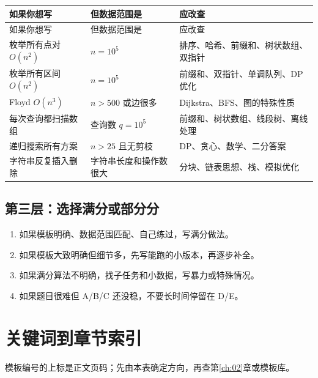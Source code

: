 \begin{longtable}{p{5cm}p{4.5cm}p{4.5cm}}
\toprule
如果你想写 & 但数据范围是 & 应改查 \\
\midrule
\endfirsthead
\toprule
如果你想写 & 但数据范围是 & 应改查 \\
\midrule
\endhead
枚举所有点对 $O(n^2)$ & $n=10^5$ & 排序、哈希、前缀和、树状数组、双指针 \\
枚举所有区间 $O(n^2)$ & $n=10^5$ & 前缀和、双指针、单调队列、DP 优化 \\
Floyd $O(n^3)$ & $n>500$ 或边很多 & Dijkstra、BFS、图的特殊性质 \\
每次查询都扫描数组 & 查询数 $q=10^5$ & 前缀和、树状数组、线段树、离线处理 \\
递归搜索所有方案 & $n>25$ 且无剪枝 & DP、贪心、数学、二分答案 \\
字符串反复插入删除 & 字符串长度和操作数很大 & 分块、链表思想、栈、模拟优化 \\
\bottomrule
\end{longtable}

\subsection{第三层：选择满分或部分分}

\begin{enumerate}
  \item 如果模板明确、数据范围匹配、自己练过，写满分做法。
  \item 如果模板大致明确但细节多，先写能跑的小版本，再逐步补全。
  \item 如果满分算法不明确，找子任务和小数据，写暴力或特殊情况。
  \item 如果题目很难但 A/B/C 还没稳，不要长时间停留在 D/E。
\end{enumerate}

\section{关键词到章节索引}\label{sec:01-8}

模板编号的上标是正文页码；先由本表确定方向，再查第\ref{ch:02}章或模板库。

